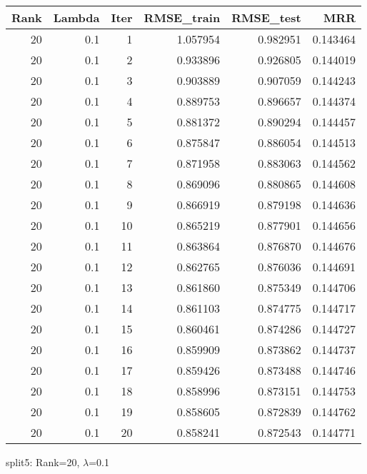 \begin{tabular}{rrrrrr}
\toprule
 Rank &  Lambda &  Iter &  RMSE\_train &  RMSE\_test &       MRR \\
\midrule
   20 &     0.1 &     1 &    1.057954 &   0.982951 &  0.143464 \\
   20 &     0.1 &     2 &    0.933896 &   0.926805 &  0.144019 \\
   20 &     0.1 &     3 &    0.903889 &   0.907059 &  0.144243 \\
   20 &     0.1 &     4 &    0.889753 &   0.896657 &  0.144374 \\
   20 &     0.1 &     5 &    0.881372 &   0.890294 &  0.144457 \\
   20 &     0.1 &     6 &    0.875847 &   0.886054 &  0.144513 \\
   20 &     0.1 &     7 &    0.871958 &   0.883063 &  0.144562 \\
   20 &     0.1 &     8 &    0.869096 &   0.880865 &  0.144608 \\
   20 &     0.1 &     9 &    0.866919 &   0.879198 &  0.144636 \\
   20 &     0.1 &    10 &    0.865219 &   0.877901 &  0.144656 \\
   20 &     0.1 &    11 &    0.863864 &   0.876870 &  0.144676 \\
   20 &     0.1 &    12 &    0.862765 &   0.876036 &  0.144691 \\
   20 &     0.1 &    13 &    0.861860 &   0.875349 &  0.144706 \\
   20 &     0.1 &    14 &    0.861103 &   0.874775 &  0.144717 \\
   20 &     0.1 &    15 &    0.860461 &   0.874286 &  0.144727 \\
   20 &     0.1 &    16 &    0.859909 &   0.873862 &  0.144737 \\
   20 &     0.1 &    17 &    0.859426 &   0.873488 &  0.144746 \\
   20 &     0.1 &    18 &    0.858996 &   0.873151 &  0.144753 \\
   20 &     0.1 &    19 &    0.858605 &   0.872839 &  0.144762 \\
   20 &     0.1 &    20 &    0.858241 &   0.872543 &  0.144771 \\
\bottomrule
\end{tabular}

\caption{split5: Rank=20, $\lambda$=0.1}

